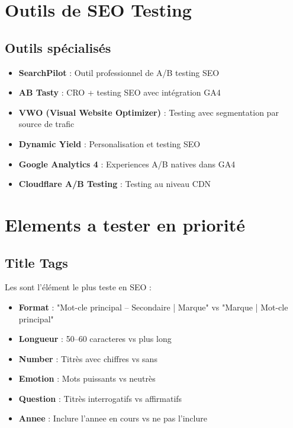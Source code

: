 \section{Outils de SEO Testing}

\subsection{Outils spécialisés}

\begin{itemize}
    \item \textbf{SearchPilot} : Outil professionnel de A/B testing SEO
    \item \textbf{AB Tasty} : CRO + testing SEO avec intégration GA4
    \item \textbf{VWO (Visual Website Optimizer)} : Testing avec segmentation par source de trafic
    \item \textbf{Dynamic Yield} : Personalisation et testing SEO
    \item \textbf{Google Analytics 4} : Experiences A/B natives dans GA4
    \item \textbf{Cloudflare A/B Testing} : Testing au niveau CDN
\end{itemize}

\section{Elements a tester en priorité}

\subsection{Title Tags}

Les  sont l'élément le plus teste en SEO :

\begin{itemize}
    \item \textbf{Format} : "Mot-cle principal -- Secondaire | Marque" vs "Marque | Mot-cle principal"
    \item \textbf{Longueur} : 50--60 caracteres vs plus long
    \item \textbf{Number} : Titrès avec chiffres vs sans
    \item \textbf{Emotion} : Mots puissants vs neutrès
    \item \textbf{Question} : Titrès interrogatifs vs affirmatifs
    \item \textbf{Annee} : Inclure l'annee en cours vs ne pas l'inclure
\end{itemize}

